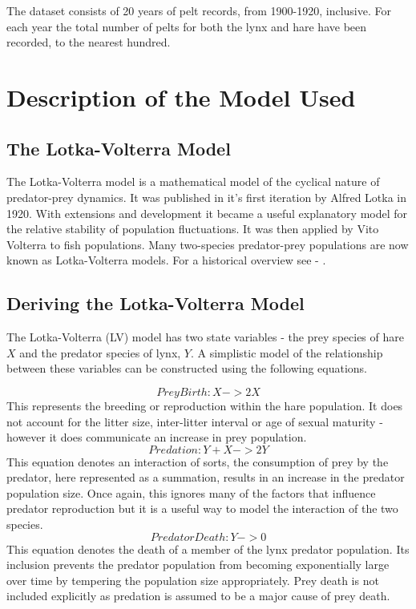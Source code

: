 \documentclass{article}
\begin{document}
The dataset consists of 20 years of pelt records, from 1900-1920, inclusive. For each year the total number of pelts for both the lynx and hare have been recorded, to the nearest hundred. 

\clearpage
\section{Description of the Model Used}
\subsection{The Lotka-Volterra Model}
The Lotka-Volterra model is a mathematical model of the cyclical nature of predator-prey dynamics. It was published in it's first iteration by Alfred Lotka in 1920. With extensions and development it became a useful explanatory model for the relative stability of population fluctuations. It was then applied by Vito Volterra to fish populations. Many two-species predator-prey populations are now known as Lotka-Volterra models. For a historical overview see - \parencite{berryman_orgins_1992}.

\subsection{Deriving the Lotka-Volterra Model}
The Lotka-Volterra (LV) model has two state variables - the prey species of hare $X$ and the predator species of lynx, $Y$. A simplistic model of the relationship between these variables can be constructed using the following equations. 

\begin{equation}
    PreyBirth :  X -> 2X
\end{equation}
 This represents the breeding or reproduction within the hare population. It does not account for the litter size, inter-litter interval or age of sexual maturity - however it does communicate an increase in prey population.
\begin{equation}
    Predation :  Y + X -> 2Y
\end{equation}
This equation denotes an interaction of sorts, the consumption of prey by the predator, here represented as a summation, results in an increase in the predator population size. Once again, this ignores many of the factors that influence predator reproduction but it is a useful way to model the interaction of the two species. 
\begin{equation}
    PredatorDeath : Y -> 0
\end{equation}
This equation denotes the death of a member of the lynx predator population. Its inclusion prevents the predator population from becoming exponentially large over time by tempering the population size appropriately. Prey death is not included explicitly as predation is assumed to be a major cause of prey death. 
\end{document}
